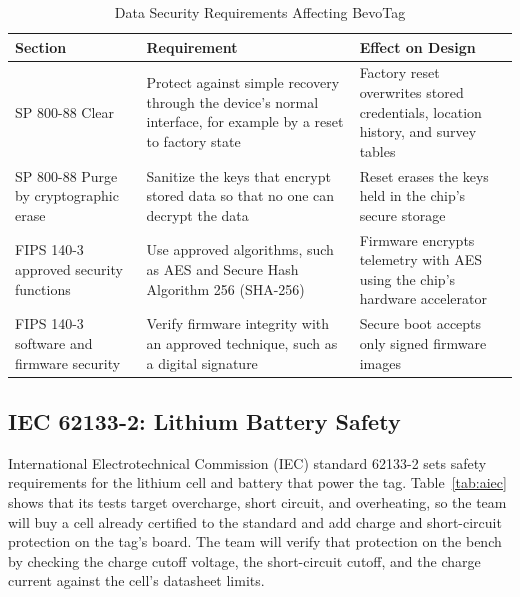 \documentclass[12pt,letterpaper]{article}
\newenvironment{spectable}{\setstretch{1.0}\renewcommand{\arraystretch}{1.1}}{}
\begin{document}
\begin{table}[H]
\caption{Data Security Requirements Affecting BevoTag}
\label{tab:anist}
\centering
\begin{spectable}
\begin{tabularx}{\linewidth}{@{}L{1.7in} Y Y@{}}
\toprule
\textbf{Section} & \textbf{Requirement} & \textbf{Effect on Design} \\
\midrule
SP 800-88 Clear & Protect against simple recovery through the device's normal interface, for example by a reset to factory state & Factory reset overwrites stored credentials, location history, and survey tables \\
SP 800-88 Purge by cryptographic erase & Sanitize the keys that encrypt stored data so that no one can decrypt the data & Reset erases the keys held in the chip's secure storage \\
FIPS 140-3 approved security functions & Use approved algorithms, such as AES and Secure Hash Algorithm 256 (SHA-256) & Firmware encrypts telemetry with AES using the chip's hardware accelerator \\
FIPS 140-3 software and firmware security & Verify firmware integrity with an approved technique, such as a digital signature & Secure boot accepts only signed firmware images \\
\bottomrule
\end{tabularx}
\end{spectable}
\end{table}

\subsection*{IEC 62133-2: Lithium Battery Safety}
International Electrotechnical Commission (IEC) standard 62133-2 \cite{iec62133} sets safety
requirements for the lithium cell and battery that power the tag. Table~\ref{tab:aiec} shows that its
tests target overcharge, short circuit, and overheating, so the team will buy a cell already certified
to the standard and add charge and short-circuit protection on the tag's board. The team will verify
that protection on the bench by checking the charge cutoff voltage, the short-circuit cutoff, and the
charge current against the cell's datasheet limits.
\end{document}
